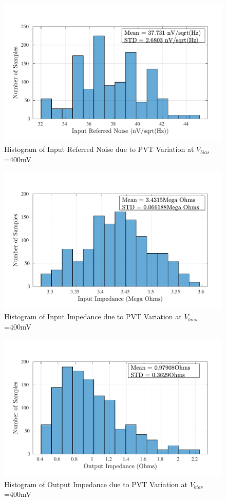\begin{figure} [H]
\centering
\includegraphics[scale=1]{Figures/Corners/Overall/PVT_Mid/PDFs/PVT_Mid_irn.pdf}
\caption{Histogram of Input Referred Noise due to PVT Variation at $V_{bias}$=400mV}
\end{figure}

\begin{figure} [H]
\centering
\includegraphics[scale=1]{Figures/Corners/Overall/PVT_Mid/PDFs/PVT_Mid_zin.pdf}
\caption{Histogram of Input Impedance due to PVT Variation at $V_{bias}$=400mV}
\end{figure}

\begin{figure} [H]
\centering
\includegraphics[scale=1]{Figures/Corners/Overall/PVT_Mid/PDFs/PVT_Mid_zout.pdf}
\caption{Histogram of Output Impedance due to PVT Variation at $V_{bias}$=400mV}
\end{figure}

